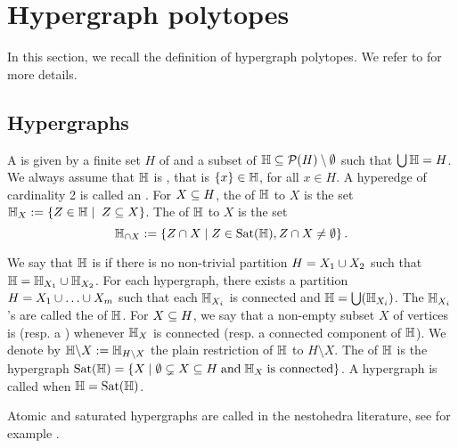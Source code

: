 
\section{Hypergraph polytopes} 
\label{s:hypergraph}

In this section, we recall the definition of hypergraph polytopes. 
We refer to \cite{DP-HP,COI} for more details. 


\subsection{Hypergraphs}
A  is given by a finite set $H$ of  and a subset of  ${\mathbb H}\subseteq {\cal P}(H)\setminus\emptyset$ such that $\bigcup {\mathbb H}=H$. 
We always assume that ${\mathbb H}$ is , that is $\left\{x\right\}\in {\mathbb H}$, for all $x\in H$. 
A hyperedge of cardinality 2 is called an .  
For $X\subseteq H$, the  of ${\mathbb H}$ to $X$ is the set 
${\mathbb H}_X := \left\{Z\in {\mathbb H} \mid \; Z\subseteq X\right\}$.
The  of ${\mathbb H}$ to $X$ is the set $${\mathbb H}_{\cap X}:=\left\{Z\cap X \mid Z\in \operatorname{Sat}({\mathbb H}), Z\cap X\neq\emptyset\right\}.$$

We say that ${\mathbb H}$ is  if there is no non-trivial partition $H=X_1\cup X_2$ such that ${\mathbb H}={\mathbb H}_{X_1}\cup {\mathbb H}_{X_2}$. 
For each hypergraph, there exists a partition $H=X_1\cup\ldots\cup X_m$ such that each ${\mathbb H}_{X_i}$ is connected and ${\mathbb H}=\bigcup({\mathbb H}_{X_i})$.  
The ${\mathbb H}_{X_i}$'s are called the  of ${\mathbb H}$.
For $X\subseteq H$, we say that a non-empty subset $X$ of vertices is  (resp. a ) whenever ${\mathbb H}_X$ is connected (resp. a connected component of ${\mathbb H}$).  
We denote by ${\mathbb H}\backslash X:={\mathbb H}_{H\setminus X}$ the plain restriction of ${\mathbb H}$ to $H \setminus X$.
The  of ${\mathbb H}$ is the hypergraph
$\operatorname{Sat}({\mathbb H})=\left\{X \mid \emptyset\subsetneq X\subseteq H\;\mbox{and}\;{\mathbb H}_X\;\mbox{is connected}\right\}$.
A hypergraph is called  when ${\mathbb H}=\operatorname{Sat}({\mathbb H})$.  

\begin{rem}
    Atomic and saturated hypergraphs are called  in the nestohedra literature, see for example \cite{P09,FS05}.
\end{rem}


